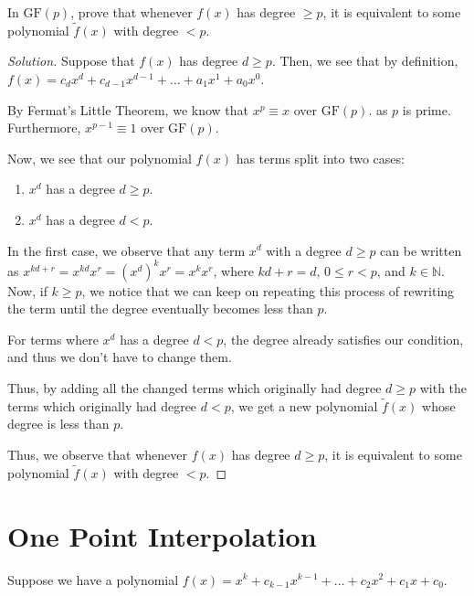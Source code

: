 \documentclass{article}
\newenvironment{solution}{\begin{proof}[Solution]}{\end{proof}}
\newcommand{\NN}{\mathbb{N}}
\begin{document}
\begin{hw}
	In $\mathrm{GF}(p)$, prove that whenever $f(x)$ has degree $\ge p$, it is equivalent to some polynomial $\tilde f(x)$ with degree $< p$.
\end{hw}
\begin{solution}
	Suppose that $f(x)$ has degree $d \geq p$. Then, we see that by definition, $f(x) = c_{d}x^{d} + c_{d-1}x^{d-1} + \ldots + a_{1}x^{1} + a_{0}x^{0}$.
	
	By Fermat's Little Theorem, we know that $x^{p} \equiv x$ over $\mathrm{GF}(p)$. as $p$ is prime. Furthermore, $x^{p-1} \equiv 1$ over $\mathrm{GF}(p)$.
	
	Now, we see that our polynomial $f(x)$ has terms split into two cases:
	\begin{enumerate}
		\item $x^{d}$ has a degree $d \geq p$.
		\item $x^{d}$ has a degree $d < p$.
	\end{enumerate}
	
	In the first case, we observe that any term $x^{d}$ with a degree $d \geq p$ can be written as $x^{kd + r} = x^{kd}x^{r} = (x^{d})^{k}x^{r} = x^{k}x^{r}$, where $kd + r = d$, $0 \leq r < p$, and $k \in \NN$. Now, if $k \geq p$, we notice that we can keep on repeating this process of rewriting the term until the degree eventually becomes less than $p$.
	
	For terms where $x^{d}$ has a degree $d < p$, the degree already satisfies our condition, and thus we don't have to change them.
	
	Thus, by adding all the changed terms which originally had degree $d \geq p$ with the terms which originally had degree $d < p$, we get a new polynomial $\tilde f(x)$ whose degree is less than $p$.
	
	Thus, we observe that whenever $f(x)$ has degree $d \geq p$, it is equivalent to some polynomial $\tilde f(x)$ with degree $< p$.
\end{solution}

\newpage

\section{One Point Interpolation}
Suppose we have a polynomial $f(x) = x^k + c_{k-1}x^{k-1} + \dots + c_2x^2 + c_1x + c_0$.
\end{document}
